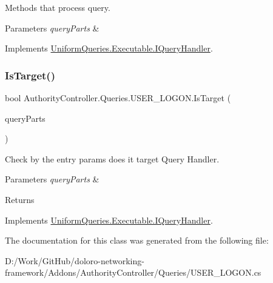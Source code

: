 Methods that process query. 


\begin{DoxyParams}{Parameters}
{\em query\+Parts} & \\
\hline
\end{DoxyParams}


Implements \mbox{\hyperlink{interface_uniform_queries_1_1_executable_1_1_i_query_handler_a3268d72c0388f5e3debba4d73bdfe523}{Uniform\+Queries.\+Executable.\+I\+Query\+Handler}}.

\mbox{\label{class_authority_controller_1_1_queries_1_1_u_s_e_r___l_o_g_o_n_a53261c6c60dc1a2324a67adf19f7547a}} 
\subsubsection{\texorpdfstring{Is\+Target()}{IsTarget()}}
{\footnotesize\ttfamily bool Authority\+Controller.\+Queries.\+U\+S\+E\+R\+\_\+\+L\+O\+G\+O\+N.\+Is\+Target (\begin{DoxyParamCaption}\item[{\mbox{\hyperlink{struct_uniform_queries_1_1_query_part}{Query\+Part}} \mbox{[}$\,$\mbox{]}}]{query\+Parts }\end{DoxyParamCaption})}



Check by the entry params does it target Query Handler. 


\begin{DoxyParams}{Parameters}
{\em query\+Parts} & \\
\hline
\end{DoxyParams}
\begin{DoxyReturn}{Returns}

\end{DoxyReturn}


Implements \mbox{\hyperlink{interface_uniform_queries_1_1_executable_1_1_i_query_handler_a0f43184bf3e306a7cbebc39098f044ee}{Uniform\+Queries.\+Executable.\+I\+Query\+Handler}}.



The documentation for this class was generated from the following file\+:\begin{DoxyCompactItemize}
\item 
D\+:/\+Work/\+Git\+Hub/doloro-\/networking-\/framework/\+Addons/\+Authority\+Controller/\+Queries/U\+S\+E\+R\+\_\+\+L\+O\+G\+O\+N.\+cs\end{DoxyCompactItemize}
